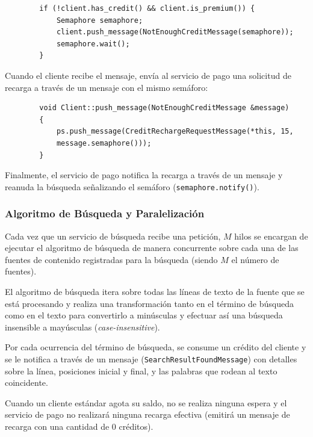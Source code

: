 \documentclass[a4paper]{article}
\begin{document}
	\begin{verbatim}
		if (!client.has_credit() && client.is_premium()) {
			Semaphore semaphore;
			client.push_message(NotEnoughCreditMessage(semaphore));
			semaphore.wait();
		}
	\end{verbatim}
	
	Cuando el cliente recibe el mensaje, envía al servicio de pago una solicitud de recarga a través de un mensaje con el mismo semáforo: 
	
	\begin{verbatim}
		void Client::push_message(NotEnoughCreditMessage &message)
		{
			ps.push_message(CreditRechargeRequestMessage(*this, 15,
			message.semaphore()));
		}
	\end{verbatim}
	
	Finalmente, el servicio de pago notifica la recarga a través de un mensaje y reanuda la búsqueda señalizando el semáforo (\texttt{semaphore.notify()}).
	
	\subsubsection*{Algoritmo de Búsqueda y Paralelización}
	
	Cada vez que un servicio de búsqueda recibe una petición, $M$ hilos se encargan de ejecutar el algoritmo de búsqueda de manera concurrente sobre cada una de las fuentes de contenido registradas para la búsqueda (siendo $M$ el número de fuentes).
	
	El algoritmo de búsqueda itera sobre todas las líneas de texto de la fuente que se está procesando y realiza una transformación tanto en el término de búsqueda como en el texto para convertirlo a minúsculas y efectuar así una búsqueda insensible a mayúsculas (\textit{case-insensitive}).
	
	Por cada ocurrencia del término de búsqueda, se consume un crédito del cliente y se le notifica a través de un mensaje (\texttt{SearchResultFoundMessage}) con detalles sobre la línea, posiciones inicial y final, y las palabras que rodean al texto coincidente.
	
	Cuando un cliente estándar agota su saldo, no se realiza ninguna espera y el servicio de pago no realizará ninguna recarga efectiva (emitirá un mensaje de recarga con una cantidad de $0$ créditos).
	
\end{document}
